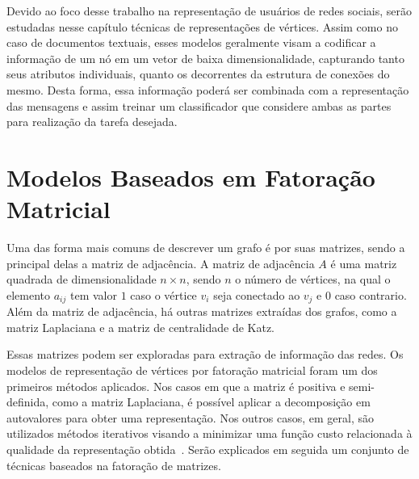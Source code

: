 Devido ao foco desse trabalho na representação de usuários de redes sociais,
serão estudadas nesse capítulo técnicas de representações de vértices.
Assim como no caso de documentos textuais, esses modelos geralmente visam a
codificar a informação de um nó em um vetor de baixa dimensionalidade,
capturando tanto seus atributos individuais, quanto os decorrentes da estrutura
de conexões do mesmo.
Desta forma, essa informação poderá ser combinada com a representação das
mensagens e assim treinar um classificador que considere ambas as partes para
realização da tarefa desejada.





\section{Modelos Baseados em Fatoração Matricial}

Uma das forma mais comuns de descrever um grafo é por suas matrizes, sendo a
principal delas a matriz de adjacência.
A matriz de adjacência $A$ é uma matriz quadrada de dimensionalidade $n \times n$,
sendo $n$ o número de vértices, na qual o elemento $a_{ij}$ tem valor $1$ caso o
vértice $v_i$ seja conectado ao $v_j$ e $0$ caso contrario.
Além da matriz de adjacência, há outras matrizes extraídas dos grafos, como
a matriz Laplaciana e a matriz de centralidade de Katz.

Essas matrizes podem ser exploradas para extração de informação das redes.
Os modelos de representação de vértices por fatoração matricial foram um dos
primeiros métodos aplicados.
Nos casos em que a matriz é positiva e semi-definida, como a matriz Laplaciana, é
possível aplicar a decomposição em autovalores para obter uma representação.
Nos outros casos, em geral, são utilizados métodos iterativos visando a
minimizar uma função custo relacionada à qualidade da representação obtida~\cite{goyal18}.
Serão explicados em seguida um conjunto de técnicas baseados na fatoração de matrizes.

